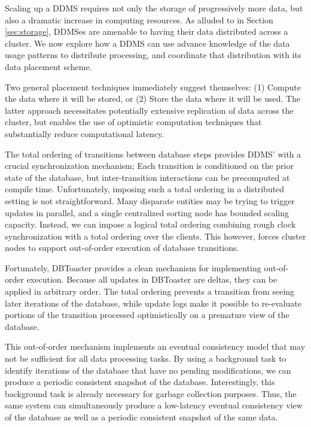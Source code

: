 Scaling up a DDMS requires not only the storage of progressively more data, but also a dramatic increase in computing resources.  As alluded to in Section \ref{sec:storage}, DDMSes are amenable to having their data distributed across a cluster.  We now explore how a DDMS can use advance knowledge of the data usage patterns to distribute processing, and coordinate that distribution with its data placement scheme.

Two general placement techniques immediately suggest themselves: (1) Compute the data where it will be stored, or (2) Store the data where it will be used.  The latter approach necessitates potentially extensive replication of data across the cluster, but enables the use of optimistic computation techniques that substantially reduce computational latency.

The total ordering of transitions between database steps provides DDMS' with a crucial synchronization mechanism; Each transition is conditioned on the prior state of the database, but inter-transition interactions can be precomputed at compile time.  Unfortunately, imposing such a total ordering in a distributed setting is not straightforward.  Many disparate entities may be trying to trigger updates in parallel, and a single centralized sorting node has bounded scaling capacity.  Instead, we can impose a logical total ordering combining rough clock synchronization with a total ordering over the clients.  This however, forces cluster nodes to support out-of-order execution of database transitions.

Fortunately, DBToaster provides a clean mechanism for implementing out-of-order execution.  Because all updates in DBToaster are deltas, they can be applied in arbitrary order.  The total ordering prevents a transition from seeing later iterations of the database, while update logs make it possible to re-evaluate portions of the transition processed optimistically on a premature view of the database.  

This out-of-order mechanism implements an eventual consistency model that may not be sufficient for all data processing tasks.  By using a background task to identify iterations of the database that have no pending modifications, we can produce a periodic consistent snapshot of the database.  Interestingly, this background task is already necessary for garbage collection purposes.  Thus, the same system can simultaneously produce a low-latency eventual consistency view of the database as well as a periodic consistent snapshot of the same data.